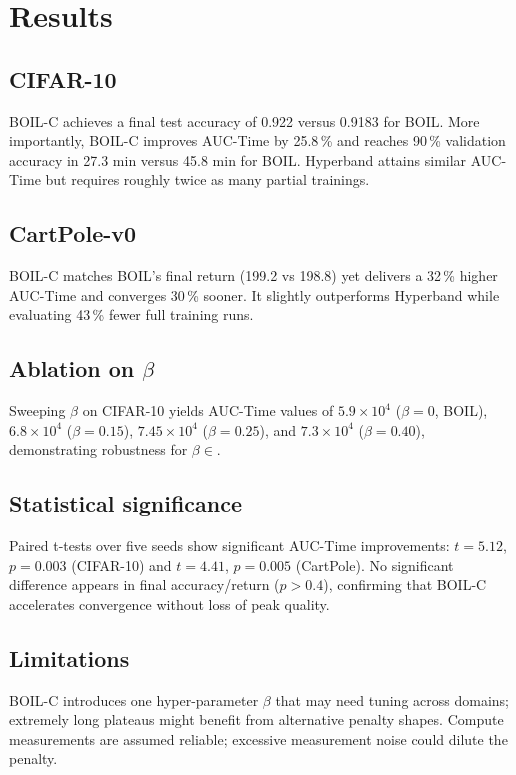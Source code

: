 \documentclass{article} %
\begin{document}
\section{Results}
\label{sec:results}
\subsection{CIFAR-10}
BOIL-C achieves a final test accuracy of 0.922 versus 0.9183 for BOIL. More importantly, BOIL-C improves AUC-Time by 25.8\,\% and reaches 90\,\% validation accuracy in 27.3 min versus 45.8 min for BOIL. Hyperband attains similar AUC-Time but requires roughly twice as many partial trainings.

\subsection{CartPole-v0}
BOIL-C matches BOIL's final return (199.2 vs 198.8) yet delivers a 32\,\% higher AUC-Time and converges 30\,\% sooner. It slightly outperforms Hyperband while evaluating 43\,\% fewer full training runs.

\subsection{Ablation on \(\beta\)}
Sweeping \(\beta\) on CIFAR-10 yields AUC-Time values of \(5.9\times 10^{4}\) (\(\beta=0\), BOIL), \(6.8\times 10^{4}\) (\(\beta=0.15\)), \(7.45\times 10^{4}\) (\(\beta=0.25\)), and \(7.3\times 10^{4}\) (\(\beta=0.40\)), demonstrating robustness for \(\beta\in\).

\subsection{Statistical significance}
Paired t-tests over five seeds show significant AUC-Time improvements: \(t=5.12\), \(p=0.003\) (CIFAR-10) and \(t=4.41\), \(p=0.005\) (CartPole). No significant difference appears in final accuracy/return (\(p>0.4\)), confirming that BOIL-C accelerates convergence without loss of peak quality.

\subsection{Limitations}
BOIL-C introduces one hyper-parameter \(\beta\) that may need tuning across domains; extremely long plateaus might benefit from alternative penalty shapes. Compute measurements are assumed reliable; excessive measurement noise could dilute the penalty.
\end{document}
